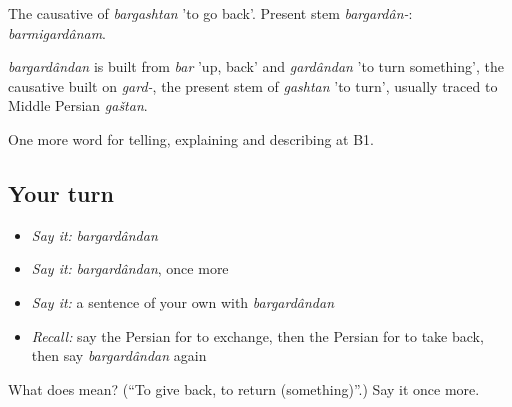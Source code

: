 The causative of \emph{bargashtan} 'to go back'. Present stem \emph{bargardân-}: \emph{barmigardânam}.

\begin{cousinweb}
\emph{bargardândan} is built from \emph{bar} 'up, back' and \emph{gardândan} 'to turn something', the causative built on \emph{gard-}, the present stem of \emph{gashtan} 'to turn', usually traced to Middle Persian \emph{gaštan}.
\end{cousinweb}

\begin{grammarlens}[title={What you've built}]
One more word for telling, explaining and describing at B1.
\end{grammarlens}

\subsection*{Your turn}
\begin{itemize}
\raggedright
  \item \emph{Say it:} \emph{bargardândan}
  \item \emph{Say it:} \emph{bargardândan}, once more
  \item \emph{Say it:} a sentence of your own with \emph{bargardândan}
  \item \emph{Recall:} say the Persian for to exchange, then the Persian for to take back, then say \emph{bargardândan} again
\end{itemize}

\begin{tcolorbox}[breakable,colback=teal!4,colframe=teal!35!black,title={Before you move on}]
What does  mean? (\textquotedblleft{}To give back, to return (something)\textquotedblright{}.) Say it once more.
\end{tcolorbox}

